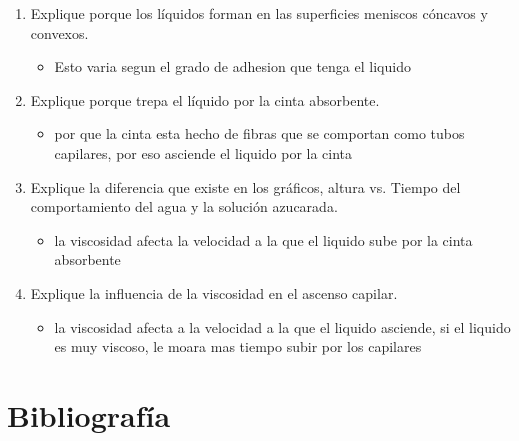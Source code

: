 \documentclass[11pt, letterpaper]{article}
\begin{document}
\begin{enumerate}
   \item Explique porque los líquidos forman en las superficies meniscos cóncavos y convexos.
   \begin{itemize}
     \item Esto varia segun el grado de adhesion que tenga el liquido
   \end{itemize}
   \item Explique porque trepa el líquido por la cinta absorbente.
   \begin{itemize}
     \item por que la cinta esta hecho de fibras que se comportan como tubos capilares, por eso asciende el liquido por la cinta
   \end{itemize}
   \item Explique la diferencia que existe en los gráficos, altura vs. Tiempo del comportamiento del agua y la solución azucarada.
   \begin{itemize}
     \item la viscosidad afecta la velocidad a la que el liquido sube por la cinta absorbente
   \end{itemize}
   \item Explique la influencia de la viscosidad en el ascenso capilar.
   \begin{itemize}
     \item la viscosidad afecta a la velocidad a la que el liquido asciende, si el liquido es muy viscoso, le moara mas tiempo subir por los capilares
   \end{itemize}
   
\end{enumerate}



\section{Bibliografía}
\end{document}
